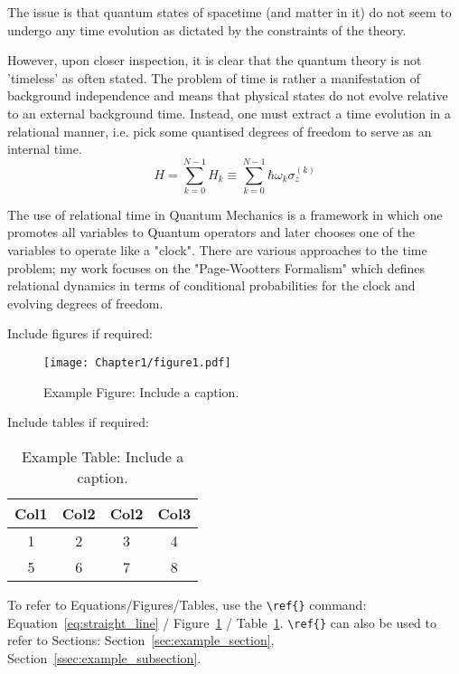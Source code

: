 The issue is that quantum states of spacetime (and matter in it) do not seem to undergo any time evolution as dictated by the constraints of the theory.
\begin{Frame}
However, upon closer inspection, it is clear that the quantum theory is not 'timeless' as often stated. The problem of time is rather a manifestation of background independence and means that physical states do not evolve relative to an external background time. Instead, one must extract a time evolution in a relational manner, i.e. pick some quantised degrees of freedom to serve as an internal time.
    \begin{equation}
\label{eq:glob_ham}
    H = \sum_{k = 0}^{N-1} H_k 	\equiv \sum_{k = 0}^{N-1} \hbar 
\omega_k \sigma_{z}^{(k)}
\end{equation} 
\end{Frame}
 The use of relational time in Quantum Mechanics is a framework in which one promotes all variables to Quantum operators and later chooses one of the variables to operate like a "clock". There are various approaches to the time problem; my work focuses on the "Page-Wootters Formalism" which defines relational dynamics in terms of conditional probabilities for the clock and evolving degrees of freedom.




Include figures if required:
\begin{figure}[ht!]
    \centering
    \texttt{[image: Chapter1/figure1.pdf]}
    \caption{Example Figure: Include a caption.}
    \label{fig:example_figure}
\end{figure}

\newpage

Include tables if required:
\begin{table}[ht!]
\centering
    \begin{tabular}{||c c c c||} 
     \hline
     Col1 & Col2 & Col2 & Col3 \\ [0.5ex] 
     \hline\hline
     1 & 2 & 3 & 4 \\ 
     \hline
     5 & 6 & 7 & 8 \\ 
     \hline
    \end{tabular}
\caption{Example Table: Include a caption.}
\label{table:example_table}
\end{table}

To refer to Equations/Figures/Tables, use the \verb!\ref{}! command: Equation~\ref{eq:straight_line} / Figure~\ref{fig:example_figure} / Table~\ref{table:example_table}. \verb!\ref{}! can also be used to refer to Sections: Section~\ref{sec:example_section}, Section~\ref{ssec:example_subsection}.

